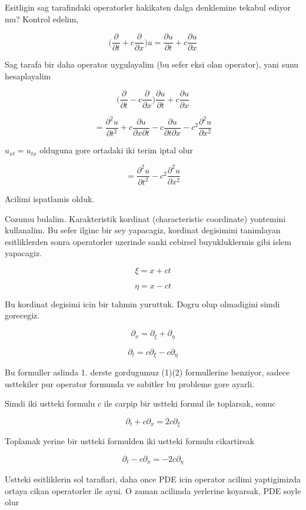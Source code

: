 \documentclass[12pt,fleqn]{article}
\begin{document}
Esitligin sag tarafindaki operatorler hakikaten dalga denklemine tekabul
ediyor mu? Kontrol edelim, 

\[ \bigg( \frac{\partial }{\partial t} + c \frac{\partial }{\partial x}
\bigg) u = 
\frac{\partial u}{\partial t} + c \frac{\partial u}{\partial x}
\]

Sag tarafa bir daha operator uygulayalim (bu sefer eksi olan operator),
yani sunu hesaplayalim

\[ 
\bigg( \frac{\partial }{\partial t} - c \frac{\partial }{\partial x} \bigg)
\frac{\partial u}{\partial t} + c \frac{\partial u}{\partial x} 
 \]

\[ = 
\frac{\partial ^2 u}{\partial t^2} + 
c \frac{\partial u}{\partial x \partial t} - 
c \frac{\partial u}{\partial t \partial x} - 
c^2\frac{\partial ^2 u}{\partial x^2} 
 \]

$u_{xt} = u_{tx}$ olduguna gore ortadaki iki terim iptal olur

\[ = 
\frac{\partial ^2 u}{\partial t^2} -
c^2\frac{\partial ^2 u}{\partial x^2} 
 \]

Acilimi ispatlamis olduk. 

Cozumu bulalim. Karakteristik kordinat (characteristic coordinate)
yontemini kullanalim. Bu sefer ilginc bir sey yapacagiz, kordinat
degisimini tanimlayan esitliklerden sonra operatorler uzerinde sanki
cebirsel buyukluklermis gibi islem yapacagiz. 

\[ \xi = x + ct \]

\[ \eta = x - ct \]

Bu kordinat degisimi icin bir tahmin yuruttuk. Dogru olup olmadigini simdi
gorecegiz. 

\[ \partial_x = \partial_\xi + \partial_\eta \]

\[ \partial_t = c\partial_\xi - c \partial_\eta \]

Bu formuller aslinda 1. derste gordugumuz (1)(2) formullerine benziyor,
sadece usttekiler pur operator formunda ve sabitler bu probleme gore
ayarli. 

Simdi iki ustteki formulu $c$ ile carpip bir ustteki formul ile toplarsak,
sonuc 

\[ \partial_t + c\partial_x = 2c \partial_\xi \]

Toplamak yerine bir ustteki formulden iki ustteki formulu cikartirsak

\[ \partial_t - c\partial_x = -2c \partial_\eta \]

Ustteki esitliklerin sol taraflari, daha once PDE icin operator acilimi
yaptigimizda ortaya cikan operatorler ile ayni. O zaman acilimda yerlerine
koyarsak, PDE soyle olur
\end{document}
